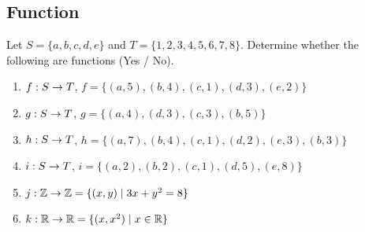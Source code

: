 \begin{questions}



\section*{Function}

 Let $S = \{a, b, c, d, e\}$ and $T = \{1, 2, 3, 4, 5, 6, 7, 8\}$. 
Determine whether the following are functions (Yes / No).
\begin{enumerate}[label=(\alph*),itemsep=0pt,parsep=0pt,topsep=0pt,partopsep=0pt
]
  \item {} 
  	$f: S \rightarrow T$, $f = \{(a,5), (b,4), (c,1), (d,3), (e,2)\}$
  \item {} 
  	$g: S \rightarrow T$, $g = \{(a,4), (d,3), (c,3), (b,5)\}$
  \item {} 
  	$h: S \rightarrow T$, $h = \{(a,7), (b,4), (c,1), (d,2), (e,3), (b,3) \}$
  \item {} 
  	$i: S \rightarrow T$, $i = \{(a,2), (b,2), (c,1), (d,5), (e,8) \}$
   \item {} 
   	$j: \mathbb{Z} \rightarrow \mathbb{Z} = \{ (x,y) \;|\; 3x + y^2 = 8 \}$
   \item {} 
   	$k: \mathbb{R} \rightarrow \mathbb{R} = \{  (x, x^2) \;|\; x \in \mathbb{R} \}$
\end{enumerate}




\end{questions}
